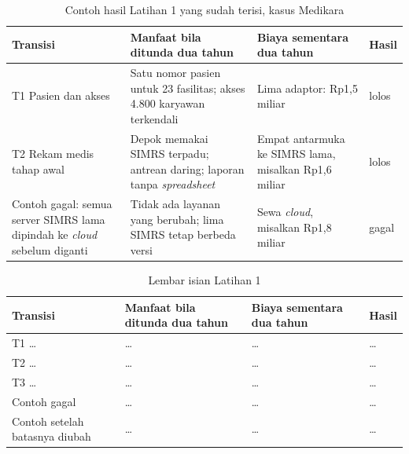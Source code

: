 \begin{table}[!htb]
  \centering
  \caption{Contoh hasil Latihan 1 yang sudah terisi, kasus Medikara}
  \label{tab:ch12-lat1-contoh}
  \begin{tabularx}{\textwidth}{>{\raggedright\arraybackslash}p{2.4cm}
                               >{\raggedright\arraybackslash}X
                               >{\raggedright\arraybackslash}p{3.0cm}l}
    \hline
    \textbf{Transisi} & \textbf{Manfaat bila ditunda dua tahun} &
      \textbf{Biaya sementara dua tahun} & \textbf{Hasil} \\
    \hline
    T1 Pasien dan akses & Satu nomor pasien untuk 23 fasilitas; akses 4.800
      karyawan terkendali & Lima adaptor: Rp1,5 miliar & lolos \\
    \hline
    T2 Rekam medis tahap awal & Depok memakai SIMRS terpadu; antrean daring;
      laporan tanpa \textit{spreadsheet} & Empat antarmuka ke SIMRS lama,
      misalkan Rp1,6 miliar & lolos \\
    \hline
    Contoh gagal: semua server SIMRS lama dipindah ke \textit{cloud}
      sebelum diganti & Tidak ada layanan yang berubah; lima SIMRS tetap
      berbeda versi & Sewa \textit{cloud}, misalkan Rp1,8 miliar & gagal \\
    \hline
  \end{tabularx}
\end{table}

\begin{table}[!htb]
  \centering
  \caption{Lembar isian Latihan 1}
  \label{tab:ch12-lat1-hasil}
  \begin{tabularx}{\textwidth}{>{\raggedright\arraybackslash}p{2.4cm}
                               >{\raggedright\arraybackslash}X
                               >{\raggedright\arraybackslash}p{3.0cm}l}
    \hline
    \textbf{Transisi} & \textbf{Manfaat bila ditunda dua tahun} &
      \textbf{Biaya sementara dua tahun} & \textbf{Hasil} \\
    \hline
    T1 \dots & \dots & \dots & \dots \\
    \hline
    T2 \dots & \dots & \dots & \dots \\
    \hline
    T3 \dots & \dots & \dots & \dots \\
    \hline
    Contoh gagal & \dots & \dots & \dots \\
    \hline
    Contoh setelah batasnya diubah & \dots & \dots & \dots \\
    \hline
  \end{tabularx}
\end{table}

